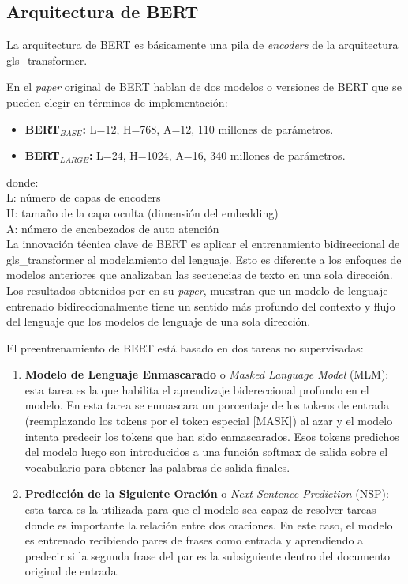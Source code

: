 \subsection{Arquitectura de BERT}
\label{subsection-arquitectura-bert}

La arquitectura de BERT es básicamente una pila de \textit{encoders} de la arquitectura \Gls{gls_transformer}. 

En el \textit{paper} original de BERT \cite{https://doi.org/10.48550/arxiv.1810.04805} hablan de dos modelos o versiones de BERT que se pueden elegir en términos de implementación:

\begin{itemize}
    \item \textbf{BERT$_{BASE}$:} L=12, H=768, A=12, 110 millones de parámetros.
    \item \textbf{BERT$_{LARGE}$:} L=24, H=1024, A=16, 340 millones de parámetros.
\end{itemize}

donde:\\
L: número de capas de encoders\\
H: tamaño de la capa oculta (dimensión del embedding)\\
A: número de encabezados de auto atención\\

La innovación técnica clave de BERT es aplicar el entrenamiento bidireccional de \Gls{gls_transformer} al modelamiento del lenguaje. Esto es diferente a los enfoques de modelos anteriores que analizaban las secuencias de texto en una sola dirección. Los resultados obtenidos por \cite{https://doi.org/10.48550/arxiv.1810.04805} en su \textit{paper}, muestran que un modelo de lenguaje entrenado bidireccionalmente tiene un sentido más profundo del contexto y flujo del lenguaje que los modelos de lenguaje de una sola dirección. 

El preentrenamiento de BERT está basado en dos tareas no supervisadas:

\begin{enumerate}
    \item \textbf{Modelo de Lenguaje Enmascarado} o \textit{Masked Language Model} (MLM): esta tarea es la que habilita el aprendizaje bidereccional profundo en el modelo. En esta tarea se enmascara un porcentaje de los tokens de entrada (reemplazando los tokens por el token especial [MASK]) al azar y el modelo intenta predecir los tokens que han sido enmascarados. Esos tokens predichos del modelo luego son introducidos a una función softmax de salida sobre el vocabulario para obtener las palabras de salida finales.
    \item  \textbf{Predicción de la Siguiente Oración} o \textit{Next Sentence Prediction} (NSP): esta tarea es la utilizada para que el modelo sea capaz de resolver tareas donde es importante la relación entre dos oraciones. En este caso, el modelo es entrenado recibiendo pares de frases como entrada y aprendiendo a predecir si la segunda frase del par es la subsiguiente dentro del documento original de entrada.
\end{enumerate}

